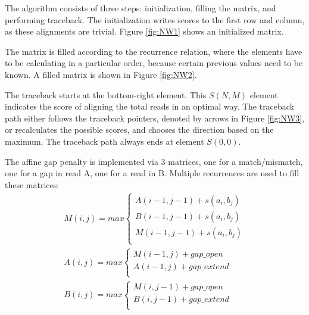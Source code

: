 \documentclass[../main/thesis.tex]{subfiles}
\begin{document}
The algorithm consists of three steps: initialization, filling the matrix, and performing traceback.
The initialization writes scores to the first row and column, as these alignments are trivial.
Figure \ref{fig:NW1} shows an initialized matrix.


The matrix is filled according to the recurrence relation, where the elements have to be calculating in a particular order, because certain previous values need to be known.
A filled matrix is shown in Figure \ref{fig:NW2}.


The traceback starts at the bottom-right element.
This $S(N,M)$ element indicates the score of aligning the total reads in an optimal way.
The traceback path either follows the traceback pointers, denoted by arrows in Figure \ref{fig:NW3}, or recalculates the possible scores, and chooses the direction based on the maximum.
The traceback path always ends at element $S(0,0)$.



The affine gap penalty is implemented via 3 matrices, one for a match/mismatch, one for a gap in read A, one for a read in B.
Multiple recurrences are used to fill these matrices:
\begin{align}
M(i,j) = max
\begin{cases}
A(i-1,j-1) + s(a_i,b_j) \\
B(i-1,j-1) + s(a_i,b_j) \\
M(i-1,j-1) + s(a_i,b_j) \\
\end{cases}
\\
A(i,j) = max
\begin{cases}
M(i-1,j) + gap\_open \\
A(i-1,j) + gap\_extend \\
\end{cases}
\\
B(i,j) = max
\begin{cases}
M(i,j-1) + gap\_open \\
B(i,j-1) + gap\_extend \\
\end{cases}
\label{eq:NW_recursion_affine}
\end{align}
\end{document}
